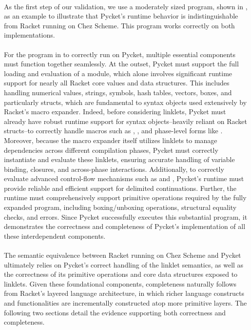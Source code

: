 	\paragraph{}%
		As the first step of our validation, we use a moderately sized program, shown in , as an example to illustrate that Pycket's runtime behavior is indistinguishable from Racket running on Chez Scheme. This program works correctly on both implementations.


	\paragraph{}%
		For the program in  to correctly run on Pycket, multiple essential components must function together seamlessly. At the outset, Pycket must support the full loading and evaluation of a  module, which alone involves significant runtime support for nearly all Racket core values and data structures. This includes handling numerical values, strings, symbols, hash tables, vectors, boxes, and particularly structs, which are fundamental to syntax objects used extensively by Racket’s macro expander. Indeed, before considering linklets, Pycket must already have robust runtime support for syntax objects--heavily reliant on Racket structs--to correctly handle macros such as , , and phase-level forms like . Moreover, because the macro expander itself utilizes linklets to manage dependencies across different compilation phases, Pycket must correctly instantiate and evaluate these linklets, ensuring accurate handling of variable binding, closures, and across-phase interactions. Additionally, to correctly evaluate advanced control-flow mechanisms such as  and , Pycket's runtime must provide reliable and efficient support for delimited continuations. Further, the runtime must comprehensively support primitive operations required by the fully expanded program, including boxing/unboxing operations, structural equality checks, and errors. Since Pycket successfully executes this substantial program, it demonstrates the correctness and completeness of Pycket’s implementation of all these interdependent components.

	\paragraph{}%
		The semantic equivalence between Racket running on Chez Scheme and Pycket ultimately relies on Pycket's correct handling of the linklet semantics, as well as the correctness of its primitive operations and core data structures exposed to linklets. Given these foundational components, completeness naturally follows from Racket’s layered language architecture, in which richer language constructs and functionalities are incrementally constructed atop more primitive layers. The following two sections detail the evidence supporting both correctness and completeness.

